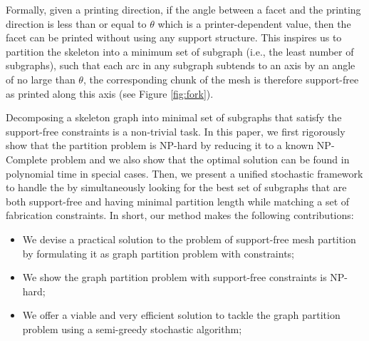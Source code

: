 Formally, given a printing direction, if the angle between a facet and the printing direction is less than or equal to $\theta$ which is a printer-dependent value, then the facet can be printed without using any support structure.{\color{red}  This inspires us to partition the skeleton into a minimum set of subgraph (i.e., the least number of subgraphs)}, such that each arc in any subgraph subtends to an axis by an angle of no large than $\theta$, the corresponding chunk of the mesh is therefore support-free as printed along this axis (see Figure \ref{fig:fork}). %


{Decomposing a skeleton graph into minimal set of subgraphs that satisfy the support-free constraints is a non-trivial task. In this paper, we first rigorously show that the partition problem is NP-hard by reducing it to a known NP-Complete problem and we also show that the optimal solution can be found in polynomial time in {special} cases. Then, we present a unified stochastic framework to handle the  by simultaneously looking for} the best set of subgraphs that are both support-free and having minimal partition length while matching a set of fabrication constraints. In short, our method makes the following contributions:

{
\begin{itemize}
\item {We devise a practical solution to the problem of support-free mesh partition by formulating it as graph partition problem with constraints;}
\item {We show the graph partition problem with support-free constraints is NP-hard;}
\item {We offer a viable and very efficient solution to tackle the graph partition problem using a semi-greedy stochastic algorithm;}
\end{itemize}
}
